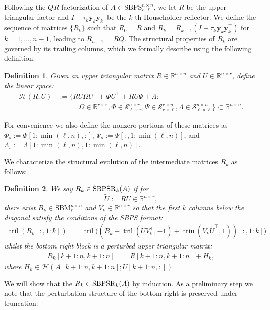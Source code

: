 \documentclass[a4paper,fleqn]{cas-sc}
\newtheorem{definition}{Definition}
\def\bbR{{\mathbb R}}
\def\SBPS{{\mathrm{SBPS}}_{r,\ell}^{n \times n}}
\def\SBPS{{\mathrm{SBPS}}_{r,\ell}^{n \times n}}
\def\calH{{\mathcal H}}
\def\calS{{\mathcal S}}
\def\bfy{{\mathbf y}}
\DeclareMathOperator{\triu}{triu}
\DeclareMathOperator{\tril}{tril}
\begin{document}
Following the $QR$ factorization of $A \in \SBPS$, we let $R$ be the upper triangular factor and $ I - \tau_k \bfy_k \bfy_k^\top$ be the $k$-th Householder reflector. We define the sequence of matrices $\{R_k\}$ such that $R_0 = R$ and $R_k = R_{k-1} (I - \tau_k \bfy_k \bfy_k^\top)$ for $k=1, \dots, n-1$, leading to $R_{n-1} = RQ$. The structural properties of $R_k$ are governed by its trailing columns, which we formally describe using the following definition:

\begin{definition}
Given an upper triangular matrix $R\in \mathbb R^{n\times n}$ and $U\in \mathbb R^{n\times r}$, define the linear space:
\begin{align*}
\calH(R;U) &:= \bigg\{
RU\Omega U^\top + \Phi U^\top + RU\Psi + \Lambda :\\
&\qquad\quad  \Omega \in \mathbb{R}^{r\times r},  \Phi \in \calS_{\ell \times r}^{n \times r},  \Psi \in \calS_{r \times \ell}^{r \times n},  \Lambda \in \calS_{\ell \times \ell}^{n \times n}
\bigg\} \subset \bbR^{n \times n}.
\end{align*}
\end{definition}

For convenience we also define the nonzero portions of these matrices as $\Phi_s:=\Phi[1:\min(\ell,n),:]$, $\Psi_s:=\Psi[:,1:\min(\ell,n)]$, and $\Lambda_s:=\Lambda[1:\min(\ell,n),1:\min(\ell,n)]$.

We characterize the structural evolution of the intermediate matrices $R_k$ as follows:

\begin{definition}
We say $R_k \in {\rm SBPSR}_k(A)$ if for
\[
\tilde U :=  RU \in \bbR^{n \times r},
\]
 there exist 
 $B_k \in {\mathrm{SBM}}_{\ell}^{n \times n}$ and
$V_k \in \bbR^{n \times r}$ 
so that the first $k$ columns below the diagonal satisfy the conditions of the SBPS format:
\begin{align*}
\tril (R_k[:,1\!:\!k]) &= \tril \big((B_k + \tril(\tilde U V_k^\top, -1) + \triu(V_k \tilde U^\top,1))[:,1\!:\!k]\big) 
\end{align*}
whilst the bottom right block is a perturbed upper triangular matrix:
\begin{align*}
R_k[k\!+\!1\!:\!n,k\!+\!1\!:\!n] &= R[k+1\!:\!n,k+1\!:\!n] + H_k,
\end{align*}
where $H_k \in \calH(A[k+1\!:\!n,k+1\!:\!n];U[k+1:n,:])$.
\end{definition}

We will show that the $R_k \in {\rm SBPSR}_k(A)$ by induction.
As a preliminary step we note that the perturbation structure of the bottom right is preserved under truncation:
\end{document}
